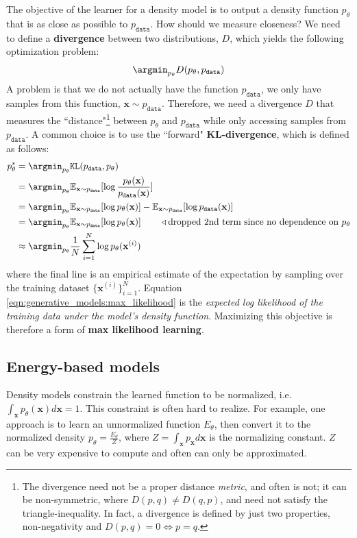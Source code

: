 The objective of the learner for a density model is to output a density function $p_{\theta}$ that is as close as possible to $p_{\texttt{data}}$. How should we measure closeness? We need to define a {\bf divergence} between two distributions, $D$, which yields the following optimization problem:
\begin{equation}
    \argmin_{p_\theta} D(p_{\theta}, p_{\texttt{data}})
\end{equation}
A problem is that we do not actually have the function $p_{\texttt{data}}$, we only have samples from this function, $\mathbf{x} \sim p_{\texttt{data}}$. Therefore, we need a divergence $D$ that measures the ``distance"\footnote{The divergence need not be a proper distance \emph{metric}, and often is not; it can be non-symmetric, where $D(p,q) \neq D(q,p)$, and need not satisfy the triangle-inequality. In fact, a divergence is defined by just two properties, non-negativity and $D(p,q) = 0 \iff p=q$.} between $p_{\theta}$ and $p_{\texttt{data}}$ while only accessing samples from $p_{\texttt{data}}$. A common choice is to use the ``forward" {\bf KL-divergence}, which is defined as follows:
\begin{align}
    p_{\theta}^* &= \argmin_{p_\theta} \texttt{KL}(p_{\texttt{data}}, p_{\theta})\\
    &= \argmin_{p_\theta} \mathbb{E}_{\mathbf{x} \sim p_{\texttt{data}}}[\log \frac{p_{\theta}(\mathbf{x})}{p_{\texttt{data}}(\mathbf{x})}]\\
    &= \argmin_{p_\theta} \mathbb{E}_{\mathbf{x} \sim p_{\texttt{data}}}[\log p_{\theta}(\mathbf{x})] - \mathbb{E}_{\mathbf{x} \sim p_{\texttt{data}}}[\log p_{\texttt{data}}(\mathbf{x})]\\
    &= \argmin_{p_\theta} \mathbb{E}_{\mathbf{x} \sim p_{\texttt{data}}}[\log p_{\theta}(\mathbf{x})] \quad\quad \triangleleft{\text{dropped 2nd term since no dependence on $p_{\theta}$}} \label{eqn:generative_models:max_likelihood}\\
    &\approx \argmin_{p_\theta} \frac{1}{N} \sum_{i=1}^N \log p_{\theta}(\mathbf{x}^{(i)})
\end{align}
where the final line is an empirical estimate of the expectation by sampling over the training dataset $\{\mathbf{x}^{(i)}\}_{i=1}^N$. Equation \ref{eqn:generative_models:max_likelihood} is the \emph{expected log likelihood of the training data under the model's density function}. Maximizing this objective is therefore a form of {\bf max likelihood learning}. 

\subsection{Energy-based models}
Density models constrain the learned function to be normalized, i.e. $\int_{\mathbf{x}} p_{\theta}(\mathbf{x})d\mathbf{x} = 1$. This constraint is often hard to realize. For example, one approach is to learn an unnormalized function $E_{\theta}$, then convert it to the normalized density $p_{\theta} = \frac{E_{\theta}}{Z}$, where $Z = \int_{\mathbf{x}} p_{\mathbf{x}}d\mathbf{x}$ is the normalizing constant. $Z$ can be very expensive to compute and often can only be approximated.

